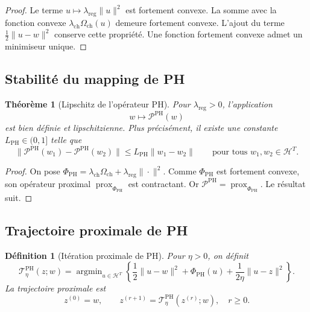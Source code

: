 \documentclass[11pt,a4paper]{article}
\newtheorem{definition}{Définition}[section]
\newtheorem{theorem}{Théorème}[section]
\newtheorem{remark}{Remarque}[section]
\DeclareMathOperator{\prox}{prox}
\DeclareMathOperator{\argmin}{argmin}
\newcommand{\Hh}{\mathcal H}
\newcommand{\Pcal}{\mathcal P}
\newcommand{\1}{\mathbf 1}
\begin{document}
\begin{proof}
Le terme \(u\mapsto \lambda_{\mathrm{reg}}\|u\|^2\) est fortement convexe.  
La somme avec la fonction convexe \(\lambda_{\mathrm{ch}}\Omega_{\mathrm{ch}}(u)\) demeure fortement convexe.  
L'ajout du terme \(\frac12\|u-w\|^2\) conserve cette propriété.  
Une fonction fortement convexe admet un minimiseur unique.
\end{proof}


\subsection{Stabilité du mapping de PH}

\begin{theorem}[Lipschitz de l'opérateur PH]
Pour \(\lambda_{\mathrm{reg}}>0\), l'application
\[
w\longmapsto \Pcal^{\mathrm{PH}}(w)
\]
est bien définie et lipschitzienne. Plus précisément, il existe une constante \(L_{\mathrm{PH}}\in(0,1]\) telle que
\[
\|\Pcal^{\mathrm{PH}}(w_1)-\Pcal^{\mathrm{PH}}(w_2)\|
\le
L_{\mathrm{PH}}\|w_1-w_2\|
\qquad
\text{pour tous } w_1,w_2\in\Hh^T.
\]
\end{theorem}

\begin{proof}
On pose \(\Phi_{\mathrm{PH}}=\lambda_{\mathrm{ch}}\Omega_{\mathrm{ch}}+\lambda_{\mathrm{reg}}\|\cdot\|^2\).  
Comme \(\Phi_{\mathrm{PH}}\) est fortement convexe, son opérateur proximal \(\prox_{\Phi_{\mathrm{PH}}}\) est contractant.  
Or \(\Pcal^{\mathrm{PH}}=\prox_{\Phi_{\mathrm{PH}}}\).  
Le résultat suit.
\end{proof}

\subsection{Trajectoire proximale de PH}

\begin{definition}[Itération proximale de PH]
Pour \(\eta>0\), on définit
\[
\mathcal T^{\mathrm{PH}}_{\eta}(z;w)
=
\argmin_{u\in\Hh^T}
\left\{
\frac12\|u-w\|^2
+\Phi_{\mathrm{PH}}(u)
+\frac{1}{2\eta}\|u-z\|^2
\right\}.
\]
La trajectoire proximale est
\[
z^{(0)}=w,
\qquad
z^{(r+1)}=\mathcal T^{\mathrm{PH}}_{\eta}(z^{(r)};w),
\quad r\ge 0.
\]
\end{definition}
\end{document}

